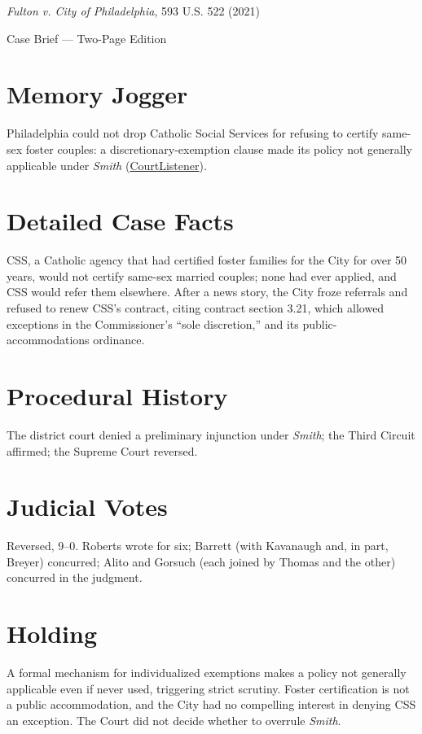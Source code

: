 \documentclass[12pt]{article}
\begin{document}
\begin{center}
{\LARGE \textit{Fulton v. City of Philadelphia}, 593 U.S. 522 (2021)\par}
\vspace{0.5em}
{\large Case Brief --- Two-Page Edition\par}
\end{center}

\section{Memory Jogger}
Philadelphia could not drop Catholic Social Services for refusing to certify same-sex foster couples: a discretionary-exemption clause made its policy not generally applicable under \textit{Smith} (\href{https://www.courtlistener.com/opinion/4892570/fulton-v-philadelphia/}{CourtListener}).

\section{Detailed Case Facts}
CSS, a Catholic agency that had certified foster families for the City for over 50 years, would not certify same-sex married couples; none had ever applied, and CSS would refer them elsewhere. After a news story, the City froze referrals and refused to renew CSS's contract, citing contract section 3.21, which allowed exceptions in the Commissioner's ``sole discretion,'' and its public-accommodations ordinance.

\section{Procedural History}
The district court denied a preliminary injunction under \textit{Smith}; the Third Circuit affirmed; the Supreme Court reversed.

\section{Judicial Votes}
Reversed, 9--0. Roberts wrote for six; Barrett (with Kavanaugh and, in part, Breyer) concurred; Alito and Gorsuch (each joined by Thomas and the other) concurred in the judgment.

\section{Holding}
A formal mechanism for individualized exemptions makes a policy not generally applicable even if never used, triggering strict scrutiny. Foster certification is not a public accommodation, and the City had no compelling interest in denying CSS an exception. The Court did not decide whether to overrule \textit{Smith}.
\end{document}
